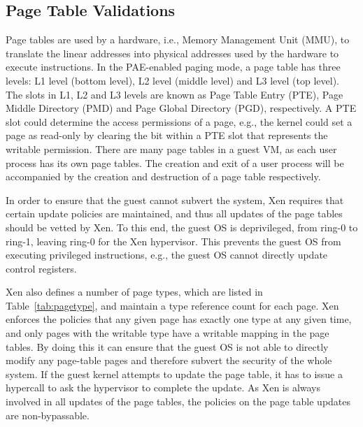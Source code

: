 \subsection{Page Table Validations}\label{sec:pv-security}

Page tables are used by a hardware, i.e., Memory Management Unit (MMU), to translate the linear addresses into physical addresses used by the hardware to execute instructions.
In the PAE-enabled paging mode, a page table has three levels: L1 level (bottom level), L2 level (middle level) and L3 level (top level).
The slots in L1, L2 and L3 levels are known as Page Table Entry (PTE), Page Middle Directory (PMD) and Page Global Directory (PGD), respectively.
A PTE slot could determine the access permissions of a page, e.g., the kernel could set a page as read-only by clearing the bit within a PTE slot that represents the writable permission.
There are many page tables in a guest VM, as each user process has its own page tables.
The creation and exit of a user process will be accompanied by the creation and destruction of a page table respectively.

In order to ensure that the guest cannot subvert the system, Xen requires that certain update policies are maintained,
and thus all updates of the page tables should be vetted by Xen.
To this end, the guest OS is deprivileged, from ring-0 to ring-1, leaving ring-0 for the Xen hypervisor.
This prevents the guest OS from executing privileged instructions, e.g., the guest OS cannot directly update control registers.

Xen also defines a number of page types, which are listed in Table~\ref{tab:pagetype}, and maintain a type reference count for each page.
Xen enforces the policies that any given page has exactly one type at any given time,
and only pages with the writable type have a writable mapping in the page tables.
By doing this it can ensure that the guest OS is not able to directly modify any page-table pages and therefore subvert the security of the whole system.
If the guest kernel attempts to update the page table, it has to issue a hypercall to ask the hypervisor to complete the update.
As Xen is always involved in all updates of the page tables, the policies on the page table updates are non-bypassable.

